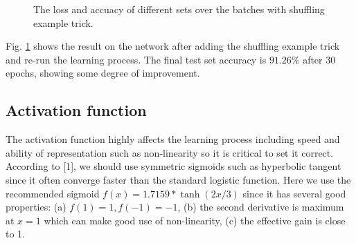 \documentclass{article} %
\begin{document}
\begin{figure} [!htbp]
	
	\caption{The loss and accuacy of different sets over the batches with shuffling example trick. }  
	\label{fig:P2}
\end{figure}

Fig. \ref{fig:P2} shows the result on the network after adding the shuffling example trick and re-run the learning process. The final test set accuracy is $91.26\%$ after 30 epochs, showing some degree of improvement.


\subsection{Activation function}
The activation function highly affects the learning process including speed and ability of representation such as non-linearity so it is critical to set it correct. According to [1], we should use symmetric sigmoids such as hyperbolic tangent since it often converge faster than the standard logistic function. Here we use the recommended sigmoid $f(x) = 1.7159*\tanh(2x/3)$ since it has several good properties: (a) $f(1) = 1, f(-1) = -1$, (b) the second derivative is maximum at $x = 1$ which can make good use of non-linearity, (c) the effective gain is close to 1. 
\end{document}
